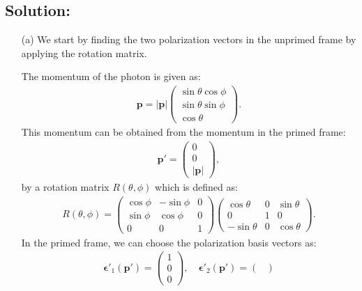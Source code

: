 \subsection*{Solution:}
\begin{enumerate}
\item [(a)] We start by finding the two polarization vectors in the unprimed frame by applying the rotation matrix.

The momentum of the photon is given as:
\begin{align*}
    \mathbf{p} = |\mathbf{p}|
    \begin{pmatrix}
        \sin \theta \cos \phi \\
        \sin \theta \sin \phi \\
        \cos \theta
    \end{pmatrix}.
\end{align*}
This momentum can be obtained from the momentum in the primed frame:
\begin{align*}
    \mathbf{p}' =
    \begin{pmatrix}
        0 \\
        0 \\
        |\mathbf{p}|
    \end{pmatrix},
\end{align*}
by a rotation matrix \( R(\theta, \phi) \) which is defined as:
\begin{align*}
    R(\theta, \phi) = 
    \begin{pmatrix}
        \cos \phi & -\sin \phi & 0 \\
        \sin \phi & \cos \phi & 0 \\
        0 & 0 & 1
    \end{pmatrix}
    \begin{pmatrix}
        \cos \theta & 0 & \sin \theta \\
        0 & 1 & 0 \\
        -\sin \theta & 0 & \cos \theta
    \end{pmatrix}.
\end{align*}
In the primed frame, we can choose the polarization basis vectors as:
\begin{align}
    \boldsymbol{\epsilon}'_1(\mathbf{p}') =
    \begin{pmatrix}
        1 \\
        0 \\
        0
    \end{pmatrix}, \quad \boldsymbol{\epsilon}'_2(\mathbf{p}') =
    \begin{pmatrix}

\end{pmatrix}
\end{align}
\end{enumerate}

